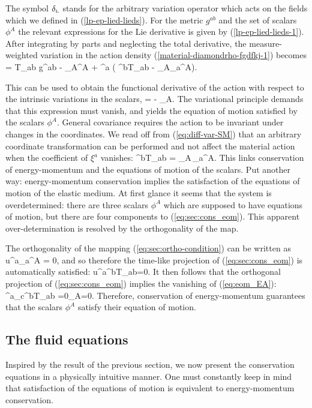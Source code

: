 The symbol ${ {\delta}_{\scriptscriptstyle{\rm{L}}}}$     stands for the  arbitrary variation operator which acts on the fields which we defined in (\ref{lp-ep-lied-lieds}). For the metric $g^{ab}$ and the set of scalars $\phi^A$   the relevant expressions for the Lie derivative is given by (\ref{lp-ep-lied-lieds-1}). 
After integrating by parts and neglecting the total derivative, the measure-weighted  variation in the action density (\ref{material-diamondrho-fgdfkj-1}) becomes
\bea
\label{eq:diff-var-SM}
\Diamond\rho = T_{ab} \ep g^{ab} - _A\ep \phi^A + \xi^a \left( \nabla^bT_{ab} - _A\nabla_a\phi^A\right).
\eea

This can be used to obtain the functional derivative of the action with respect to the intrinsic variations in the scalars,
\bea
\label{eq:eom_EA}
 = - _A.
\eea
The variational principle demands that this expression must vanish, and yields the equation of motion satisfied by the scalars $\phi^A$.
General covariance requires the action to be invariant under changes in the coordinates. We read off from (\ref{eq:diff-var-SM}) that an arbitrary coordinate transformation  can be performed and not affect the material action when the coefficient of $\xi^a$ vanishes:
\bea
\label{eq:sec:cons_eom}
\nabla^bT_{ab} = _A\,\partial_a\phi^A.
\eea
This links  conservation of energy-momentum and the equations of motion of the scalars. Put another way: energy-momentum conservation implies the satisfaction of the equations of motion of the elastic medium. At first glance it seems that the system is overdetermined: there are three scalars $\phi^A$ which are supposed to have equations of motion, but there are four components to (\ref{eq:sec:cons_eom}). This apparent over-determination is resolved by the orthogonality of the map.

The orthogonality of the mapping (\ref{eq:sec:ortho-condition})    can be written as
\bea
u^a\partial_a\phi^A = 0,
\eea
and so therefore the time-like projection of (\ref{eq:sec:cons_eom}) is automatically satisfied:
\bea
u^a\nabla^bT_{ab}=0.
\eea
It then follows that the orthogonal projection of (\ref{eq:sec:cons_eom}) implies the vanishing of (\ref{eq:eom_EA}):
\bea
{\gamma^a}_c\nabla^bT_{ab} =0\qquad \Longleftrightarrow\qquad {}_A=0.
\eea
Therefore, conservation of energy-momentum guarantees that the scalars $\phi^A$ satisfy their equation of motion.

\subsection{The fluid equations}
Inspired by the result of the previous section, we now present the conservation equations in a physically intuitive manner. One must constantly keep in mind that satisfaction of the equations of motion is equivalent to energy-momentum conservation.

